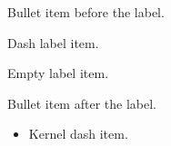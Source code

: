 \documentclass{careerdossier-resume}
\begin{document}
\begin{CDossierItemize}
  \item Bullet item before the label.
  \item[--] Dash label item.
  \item[] Empty label item.
  \item Bullet item after the label.
\end{CDossierItemize}
\begin{itemize}
  \item[--] Kernel dash item.
\end{itemize}
\end{document}
